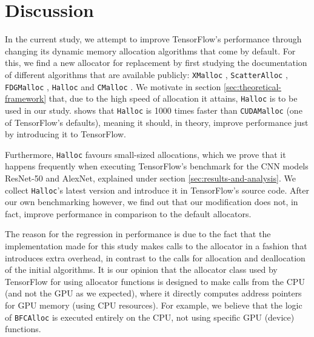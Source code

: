 \documentclass[12pt,twoside]{article}
\begin{document}
\section{Discussion}
\label{sec:discussion}

In the current study, we attempt to improve TensorFlow's performance through changing its dynamic memory allocation algorithms that come by default. For this, we find a new allocator for replacement by first studying the documentation of different algorithms that are available publicly: \texttt{XMalloc} \cite{xmalloc}, \texttt{ScatterAlloc} \cite{scatter-alloc}, \texttt{FDGMalloc} \cite{fdgmalloc}, \texttt{Halloc} \cite{halloc-paper} and \texttt{CMalloc} \cite{Vinkler2015}. We motivate in section \ref{sec:theoretical-framework} that, due to the high speed of allocation it attains, \texttt{Halloc} is to be used in our study. \cite{halloc-paper} shows that \texttt{Halloc} is 1000 times faster than \texttt{CUDAMalloc} (one of TensorFlow's defaults), meaning it should, in theory, improve performance just by introducing it to TensorFlow.

Furthermore, \texttt{Halloc} favours small-sized allocations, which we prove that it happens frequently when executing TensorFlow's benchmark for the CNN models ResNet-50 and AlexNet, explained under section \ref{sec:results-and-analysis}. We collect \texttt{Halloc}'s latest version and introduce it in TensorFlow's source code. After our own benchmarking however, we find out that our modification does not, in fact, improve performance in comparison to the default allocators.

The reason for the regression in performance is due to the fact that the implementation made for this study makes calls to the allocator in a fashion that introduces extra overhead, in contrast to the calls for allocation and deallocation of the initial algorithms. It is our opinion that the allocator class used by TensorFlow for using allocator functions is designed to make calls from the CPU (and not the GPU as we expected), where it directly computes address pointers for GPU memory (using CPU resources). For example, we believe that the logic of \texttt{BFCAlloc} is executed entirely on the CPU, not using specific GPU (device) functions.
\end{document}
